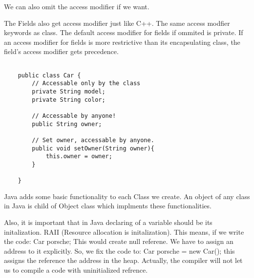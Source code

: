 \documentclass[11pt,twoside,a4paper]{report}
\begin{document}
We can also omit the access modifier if we want.

The Fields also get access modifier just like C++. The same access modfier keywords as class.
The default access modifier for fields if ommited is private. If an access modifier for fields is more restrictive than its encapsulating class,
the field's access modifier gets precedence.
\begin{lstlisting}

    public class Car {
        // Accessable only by the class
        private String model;
        private String color;

        // Accessable by anyone!
        public String owner;

        // Set owner, accessable by anyone.
        public void setOwner(String owner){
            this.owner = owner;
        }

    }

\end{lstlisting}



Java adds some basic functionality to each Class we create. An object of any class in Java is child of Object class which implments these functionalities.

Also, it is important that in Java declaring of a variable should be its initalization. RAII (Resource allocation is initalization).
This means, if we write the code: Car porsche; This would create null referene. We have to assign an address to it explicitly. So, we fix the code to:  Car porsche = new Car();
this assigns the reference the address in the heap. Actually, the compiler will not let us to compile a code with uninitialized refrence.
\end{document}
